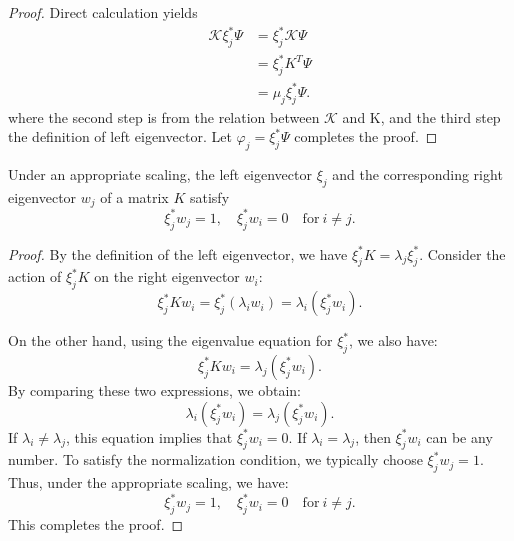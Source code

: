 \documentclass[en, bibend=bibtex]{elegantpaper}
\theoremstyle{plain}
\begin{document}
\begin{proof}
  Direct calculation yields
  \begin{align*}
    \mathcal{K} \xi_j^\ast \Psi &= \xi_j^\ast \mathcal{K} \Psi\\
                             &= \xi_j^\ast K^T \Psi\\
                             &= \mu_j \xi_j^\ast \Psi.
  \end{align*}
  where the second step is from the relation between $\mathcal{K}$ and K,
  and the third step the definition of left eigenvector.
  Let $\varphi_j = \xi_j^\ast \Psi$ completes the proof.
\end{proof}


\begin{lemma}
  \label{lem:relation-between-right-and-left-eigenvector}
  Under an appropriate scaling,
  the left eigenvector $\xi_j$ and the corresponding
  right eigenvector $w_j$ of a matrix $K$ satisfy
  \begin{equation}
    \label{eq:relation-between-right-and-left-eigenvector}
    \xi_j^{\ast} w_j = 1, \quad \xi_j^{\ast}w_i = 0 \quad  \mathrm{for} ~ i \neq j.
  \end{equation}
\end{lemma}

\begin{proof}
  By the definition of the left eigenvector, we have $\xi_j^\ast K = \lambda_j \xi_j^\ast$.
  Consider the action of $\xi_j^\ast K$ on the right eigenvector $w_i$:
  \begin{equation*}
  \xi_j^\ast K w_i = \xi_j^\ast (\lambda_i w_i) = \lambda_i (\xi_j^\ast w_i).
  \end{equation*}

  On the other hand, using the eigenvalue equation for $\xi_j^\ast$, we also have:
  \begin{equation*}
  \xi_j^\ast K w_i = \lambda_j (\xi_j^\ast w_i).
  \end{equation*}
  By comparing these two expressions, we obtain:
  \begin{equation*}
  \lambda_i (\xi_j^\ast w_i) = \lambda_j (\xi_j^\ast w_i).
  \end{equation*}
  If $\lambda_i \neq \lambda_j$, this equation implies that $\xi_j^\ast w_i = 0$.
  If $\lambda_i = \lambda_j$, then $\xi_j^\ast w_i$ can be any number.
  To satisfy the normalization condition, we typically choose $\xi_j^\ast w_j = 1$.
  Thus, under the appropriate scaling, we have:
  \begin{equation*}
  \xi_j^\ast w_j = 1, \quad \xi_j^\ast w_i = 0 \quad \mathrm{for} ~  i \neq j.
  \end{equation*}
  This completes the proof.
\end{proof}
\end{document}
